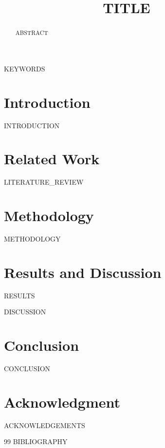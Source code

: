 \documentclass[conference]{IEEEtran}
\begin{document}
\title{{{TITLE}}}

\author{
}

\maketitle

\begin{abstract}
{{ABSTRACT}}
\end{abstract}

\begin{IEEEkeywords}
{{KEYWORDS}}
\end{IEEEkeywords}

\section{Introduction}
{{INTRODUCTION}}

\section{Related Work}
{{LITERATURE_REVIEW}}

\section{Methodology}
{{METHODOLOGY}}

\section{Results and Discussion}
{{RESULTS}}

{{DISCUSSION}}

\section{Conclusion}
{{CONCLUSION}}

\section*{Acknowledgment}
{{ACKNOWLEDGEMENTS}}


\begin{thebibliography}{99}
{{BIBLIOGRAPHY}}
\end{thebibliography}
\end{document}
